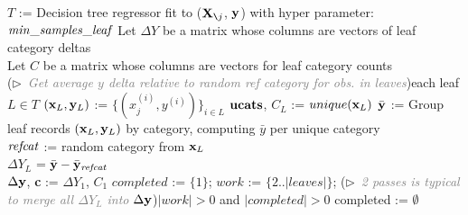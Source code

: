 \documentclass{article}
\newcommand{\cut}[1]{}
\newcommand{\Xnj}{${\bf X}_{\texttt{\char`\\} j}$}
\begin{document}
\setlength{\algomargin}{5pt}
\begin{algorithm}[H]
\SetAlgoLined
\DontPrintSemicolon
{}
\SetAlgoSkip{}
\small
\cut{
\KwOut{$\begin{array}[t]{l}
\Delta^{(k)} = \text{category } k \text{'s effect on } y \text{ where } mean(\Delta^{(k)})=0\\
n^{(k)} = \text{number of supported observations per category $k$}\\
\end{array}$
}
}
$T$ := Decision tree regressor fit to (\Xnj{}, $\bf y$) with hyper parameter: ${\it min\_samples\_leaf}$\;
Let $\Delta Y$ be a matrix whose columns are vectors of leaf category deltas\\
Let $C$ be a matrix whose columns are vectors for leaf category counts\\
\For(\hfill$\triangleright$\ {\it\textcolor{gray}{\small Get average $y$ delta relative to random ref category for obs. in leaves}}){each leaf $L \in T$}{
        $({\bf x}_L, {\bf y}_L)$ := $\{(x_j^{(i)},  y^{(i)})\}_{i \in L}$
        ${\bf ucats}$, $C_L$ := $unique({\bf x}_L)$
	$\bar{\bf y}$ := Group leaf records $({\bf x}_L, {\bf y}_L)$ by category, computing $\bar{y}$ per unique category\\
	${\it refcat}$ := random category from ${\bf x}_L$\\
	$\Delta {Y}_L$ = $\bar{\bf y} - \bar{\bf y}_{\it refcat}$\\
}
$\Delta {\bf y}$, {\bf c} := $\Delta {Y}_1$, $C_1$
$completed$ := $\{1\}$; $work$ := $\{2 .. |leaves|\}$; 
\While(\hfill$\triangleright$\ {\it\textcolor{gray}{\small 2 passes is typical to merge all $\Delta {Y}_L$ into $\Delta {\bf y}$}}){$|work| > 0$ and $|completed|>0$}{
    completed := $\emptyset$\\
    }
\end{algorithm}
\end{document}
